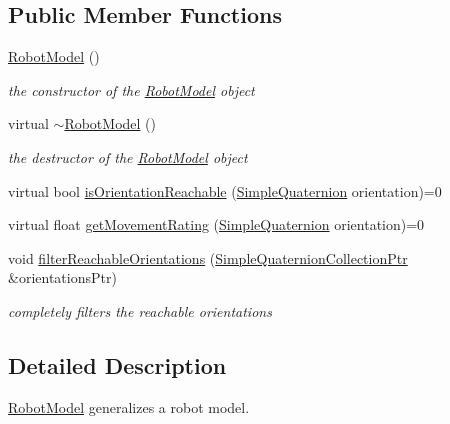 \subsection*{\-Public \-Member \-Functions}
\begin{DoxyCompactItemize}
\item 
\hyperlink{classnext__best__view_1_1RobotModel_a8bdfc4153228f6d68710be766b393035}{\-Robot\-Model} ()
\begin{DoxyCompactList}\small\item\em the constructor of the \hyperlink{classnext__best__view_1_1RobotModel}{\-Robot\-Model} object \end{DoxyCompactList}\item 
virtual \hyperlink{classnext__best__view_1_1RobotModel_a0a241bdb8ec75962ec28620f7436d9eb}{$\sim$\-Robot\-Model} ()
\begin{DoxyCompactList}\small\item\em the destructor of the \hyperlink{classnext__best__view_1_1RobotModel}{\-Robot\-Model} object \end{DoxyCompactList}\item 
virtual bool \hyperlink{classnext__best__view_1_1RobotModel_a99e88176c9d5d9dda6aa2fe3bd5c5153}{is\-Orientation\-Reachable} (\hyperlink{namespacenext__best__view_a165f1f159539ff8e583fb7fe3620390c}{\-Simple\-Quaternion} orientation)=0
\item 
virtual float \hyperlink{classnext__best__view_1_1RobotModel_a821a0585cc0fedfab08f9b3c7daae239}{get\-Movement\-Rating} (\hyperlink{namespacenext__best__view_a165f1f159539ff8e583fb7fe3620390c}{\-Simple\-Quaternion} orientation)=0
\item 
void \hyperlink{classnext__best__view_1_1RobotModel_aba4cbeb84e4693c1b82b79288cc2c14d}{filter\-Reachable\-Orientations} (\hyperlink{namespacenext__best__view_a56eab77c28120ee9265ea6fa82a4a3c5}{\-Simple\-Quaternion\-Collection\-Ptr} \&orientations\-Ptr)
\begin{DoxyCompactList}\small\item\em completely filters the reachable orientations \end{DoxyCompactList}\end{DoxyCompactItemize}


\subsection{\-Detailed \-Description}
\hyperlink{classnext__best__view_1_1RobotModel}{\-Robot\-Model} generalizes a robot model. 

